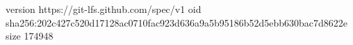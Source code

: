 version https://git-lfs.github.com/spec/v1
oid sha256:202c427c520d17128ac0710fac923d636a9a5b95186b52d5ebb630bac7d8622e
size 174948
